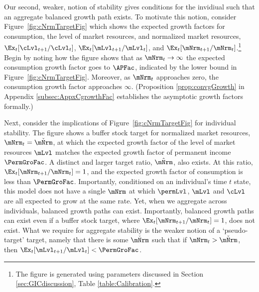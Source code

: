 \documentclass[BufferStockTheory]{subfiles}
\begin{document}
Our second, weaker, notion of stability gives conditions for the invidiual such that an aggregate balanced growth path exists. To motivate this notion, consider Figure~\ref{fig:cNrmTargetFig} which shows the expected growth factors for consumption, the level of market resources, and normalized market resources, $\Ex_{t}[\cLvl_{t+1}/\cLvl_{t}]$, $\Ex_{t}[\mLvl_{t+1}/\mLvl_{t}]$, and $\Ex_{t}[\mNrm_{t+1}/\mNrm_{t}]$.\footnote{The figure is generated using parameters discussed in Section \ref{sec:GICdiscussion}, Table \ref{table:Calibration}.}
Begin by noting how the figure shows that as $\mNrm_{t} \rightarrow \infty$ the expected consumption growth factor goes to ${\APFac}$, indicated by the lower bound in Figure~\ref{fig:cNrmTargetFig}.
Moreover, as $\mNrm_{t}$ approaches zero, the consumption growth factor approaches $\infty$.
(Proposition  \ref{prop:convgGrowth}  in Appendix \ref{subsec:AppxCgrowthFac} establishes the asymptotic growth factors formally.)

Next, consider the implications of Figure~\ref{fig:cNrmTargetFig} for individual stability.
The figure shows a buffer stock target for normalized market resources, $\mNrm_{t} = \mBalLvl$, at which the expected growth factor of the level of market resources $\mLvl$ matches the expected growth factor of permanent income $\PermGroFac$.
A distinct and larger target ratio, $\mTrgNrm$, also exists.
At this ratio, $\Ex_{t}[\mNrm_{t+1}/\mNrm_{t}]=1$, and the expected growth factor of consumption is less than $\PermGroFac$.
Importantly, conditioned on an individual's time $t$ state, this model does not have a single $\mNrm$ at which $\permLvl$, $\mLvl$ and $\cLvl$ are all expected to grow at the same rate.
Yet, when we aggregate across individuals, balanced growth paths can exist. 
Importantly, balanced growth paths can exist even if a buffer stock target, where $\Ex_{t}[\mNrm_{t+1}/\mNrm_{t}]=1$, does not exist. 
What we require for aggregate stability is the weaker notion of a `pseudo-target' target, namely that there is some ${\mBalLvl}$ such that if $\mNrm_{t}>{\mBalLvl}$, then $\Ex_{t}[\mLvl_{t+1}/\mLvl_{t}] < \PermGroFac$.




















\providecommand{\figName}{cNrmTargetFig} 
\providecommand{\figFile}{\figName} %
\renewcommand{\figName}{cNrmTargetFig} 
\hypertarget{\figFile}{}

\end{document}
